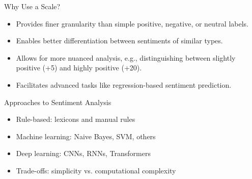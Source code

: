 \begin{frame}{Why Use a Scale?}
    \begin{itemize}
        \item Provides finer granularity than simple positive, negative, or neutral labels.
        \item Enables better differentiation between sentiments of similar types.
        \item Allows for more nuanced analysis, e.g., distinguishing between slightly positive (+5) and highly positive (+20).
        \item Facilitates advanced tasks like regression-based sentiment prediction.
    \end{itemize}
\end{frame}

\begin{frame}{Approaches to Sentiment Analysis}
    \begin{itemize}
        \item Rule-based: lexicons and manual rules
        \item Machine learning: Naive Bayes, SVM, others
        \item Deep learning: CNNs, RNNs, Transformers
        \item Trade-offs: simplicity vs. computational complexity
    \end{itemize}
\end{frame}


